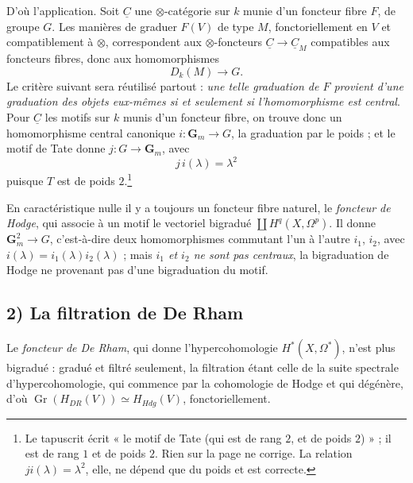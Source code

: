\documentclass[11pt,a4paper]{article}
\begin{document}
D'où l'application. Soit $\underline{C}$ une $\otimes$-catégorie sur $k$ munie
d'un foncteur fibre $F$, de groupe $G$. Les manières de graduer $F(V)$ de type
$M$, fonctoriellement en $V$ et compatiblement à $\otimes$, correspondent aux
$\otimes$-foncteurs $\underline{C} \to \underline{C}_{M}$ compatibles aux
foncteurs fibres, donc aux homomorphismes
\[
D_{k}(M) \longrightarrow G .
\]
Le critère suivant sera réutilisé partout : \emph{une telle graduation de
$F$ provient d'une graduation des objets eux-mêmes si et seulement si
l'homomorphisme est central}. Pour $\underline{C}$ les motifs sur $k$ munis
d'un foncteur fibre, on trouve donc un homomorphisme central canonique
$i \colon \mathbf{G}_{m} \to G$, la graduation par le poids ; et le motif de
Tate donne $j \colon G \to \mathbf{G}_{m}$, avec
\[
j\,i(\lambda) = \lambda^{2}
\]
puisque $T$ est de poids $2$.\footnote{Le tapuscrit écrit « le motif de Tate
(qui est de rang $2$, et de poids $2$) » ; il est de rang $1$ et de poids $2$.
Rien sur la page ne corrige. La relation $ji(\lambda) = \lambda^{2}$, elle, ne
dépend que du poids et est correcte.}

En caractéristique nulle il y a toujours un foncteur fibre naturel, le
\emph{foncteur de Hodge}, qui associe à un motif le vectoriel bigradué
$\coprod H^{q}(X, \Omega^{p})$. Il donne $\mathbf{G}_{m}^{2} \to G$,
c'est-à-dire deux homomorphismes commutant l'un à l'autre $i_{1}$, $i_{2}$,
avec $i(\lambda) = i_{1}(\lambda)i_{2}(\lambda)$ ; mais
\emph{$i_{1}$ et $i_{2}$ ne sont pas centraux}, la bigraduation de Hodge ne
provenant pas d'une bigraduation du motif.

\subsection*{2) La filtration de De Rham}

Le \emph{foncteur de De Rham}, qui donne l'hypercohomologie $H^{*}(X,
\Omega^{*})$, n'est plus bigradué : gradué et filtré seulement, la filtration
étant celle de la suite spectrale d'hypercohomologie, qui commence par la
cohomologie de Hodge et qui dégénère, d'où
$\operatorname{Gr}(H_{DR}(V)) \simeq H_{Hdg}(V)$, fonctoriellement.
\end{document}
